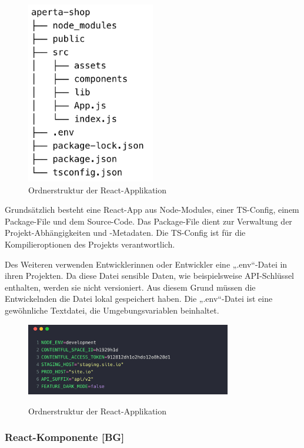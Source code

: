 \begin{figure}[H]
  \centering
  \includegraphics[width=0.5\textwidth]{pics/react-ordnerstruktur.png}
  \caption{Ordnerstruktur der React-Applikation}
\end{figure}

Grundsätzlich besteht eine React-App aus Node-Modules, einer TS-Config, einem Package-File und dem Source-Code. Das Package-File dient zur Verwaltung der Projekt-Abhängigkeiten und -Metadaten. Die TS-Config ist für die Kompilieroptionen des Projekts verantwortlich.

Des Weiteren verwenden Entwicklerinnen oder Entwickler eine „.env“-Datei in ihren Projekten. Da diese Datei sensible Daten, wie beispielsweise API-Schlüssel enthalten, werden sie nicht versioniert. Aus diesem Grund müssen die Entwickelnden die Datei lokal gespeichert haben. Die „.env“-Datei ist eine gewöhnliche Textdatei, die Umgebungsvariablen beinhaltet.
\cite{envFile}

\begin{figure}[H]
  \centering
  \includegraphics[width=0.8\textwidth]{pics/bsp-env.png}
  \caption{Ordnerstruktur der React-Applikation}
  \cite{envExample}
\end{figure}

\subsubsection{React-Komponente [BG]}

